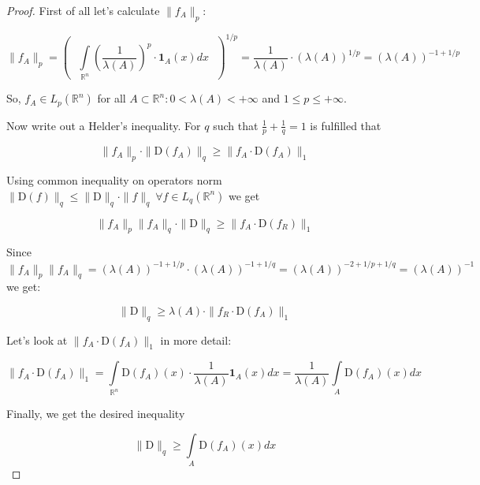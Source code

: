 \documentclass{article}
\begin{document}
    \begin{proof}
        First of all let's calculate $\|f_A\|_p$:

        \begin{equation*}
            \|f_A\|_p = \left( \text{ } \int\limits_{\mathbb{R}^n}\left(\dfrac{1}{\lambda(A)}\right)^p \cdot \textbf{1}_{A}(x) dx \text{ } \right)^{1/p} = \dfrac{1}{\lambda(A)} \cdot (\lambda(A))^{1/p} = (\lambda(A))^{-1 + 1/p}
        \end{equation*}

        So, $f_A \in L_p(\mathbb{R}^n)$ for all $A \subset \mathbb{R}^n : 0 < \lambda(A) < +\infty$ and $1 \leq p \leq +\infty$. 

        Now write out a Helder's inequality. For $q$ such that $\frac{1}{p} + \frac{1}{q} = 1$ is fulfilled that

        \begin{equation*}
            \|f_A\|_p \cdot \|\text{D}(f_A)\|_q \geq \|f_A \cdot \text{D}(f_A)\|_1
        \end{equation*}

        Using common inequality on operators norm $\|\text{D}(f)\|_q \leq \|\text{D}\|_q \cdot \|f\|_q ~\forall f \in L_q(\mathbb{R}^n)$ we get

        \begin{equation*}
            \|f_A\|_p \|f_A\|_q \cdot \|\text{D}\|_q \geq \|f_A \cdot \text{D}(f_R)\|_1
        \end{equation*}

        Since $\|f_A\|_p \|f_A\|_q = (\lambda(A))^{-1 + 1/p} \cdot (\lambda(A))^{-1 + 1/q} = (\lambda(A))^{-2 + 1/p + 1/q} = (\lambda(A))^{-1}$ we get:

        \begin{equation*}
            \|\text{D}\|_q \geq \lambda(A) \cdot \|f_R \cdot \text{D}(f_A)\|_1
        \end{equation*}

        Let's look at $\|f_A \cdot \text{D}(f_A)\|_1$ in more detail:

        \begin{equation*}
            \|f_A \cdot \text{D}(f_A)\|_1 = \int\limits_{\mathbb{R}^n} \text{D}(f_A)(x) \cdot \dfrac{1}{\lambda(A)} \textbf{1}_{A}(x) dx = \dfrac{1}{\lambda(A)} \int\limits_{A} \text{D}(f_A)(x)dx
        \end{equation*}

        Finally, we get the desired inequality

        \begin{equation*}
            \|\text{D}\|_q \geq \int\limits_{A} \text{D}(f_A)(x)dx
        \end{equation*}
    \end{proof}

    
    
\end{document}

